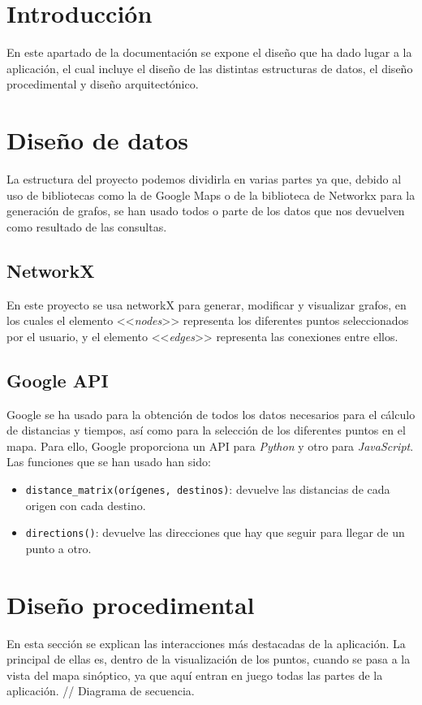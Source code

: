 
\section{Introducción}
En este apartado de la documentación se expone el diseño que ha dado lugar a la aplicación, el cual incluye el diseño de las distintas estructuras de datos, el diseño procedimental y diseño arquitectónico.

\section{Diseño de datos}
La estructura del proyecto podemos dividirla en varias partes ya que, debido al uso de bibliotecas como la de Google Maps o de la biblioteca de Networkx para la generación de grafos, se han usado todos o parte de los datos que nos devuelven como resultado de las consultas.

\subsection{NetworkX}
En este proyecto se usa networkX para generar, modificar y visualizar grafos, en los cuales el elemento <<\textit{nodes}>> representa los diferentes puntos seleccionados por el usuario, y el elemento <<\textit{edges}>> representa las conexiones entre ellos.

\subsection{Google API}
Google se ha usado para la obtención de todos los datos necesarios para el cálculo de distancias y tiempos, así como para la selección de los diferentes puntos en el mapa. Para ello, Google proporciona un API para \textit{Python} y otro para \textit{JavaScript}. Las funciones que se han usado han sido:
\begin{itemize}
	\item \texttt{distance\_matrix(orígenes, destinos)}: devuelve las distancias de cada origen con cada destino.
	\item \texttt{directions()}: devuelve las direcciones que hay que seguir para llegar de un punto a otro.
\end{itemize}


\section{Diseño procedimental}
En esta sección se explican las interacciones más destacadas de la aplicación. La principal de ellas es, dentro de la visualización de los puntos, cuando se pasa a la vista del mapa sinóptico, ya que aquí entran en juego todas las partes de la aplicación.
// Diagrama de secuencia.


